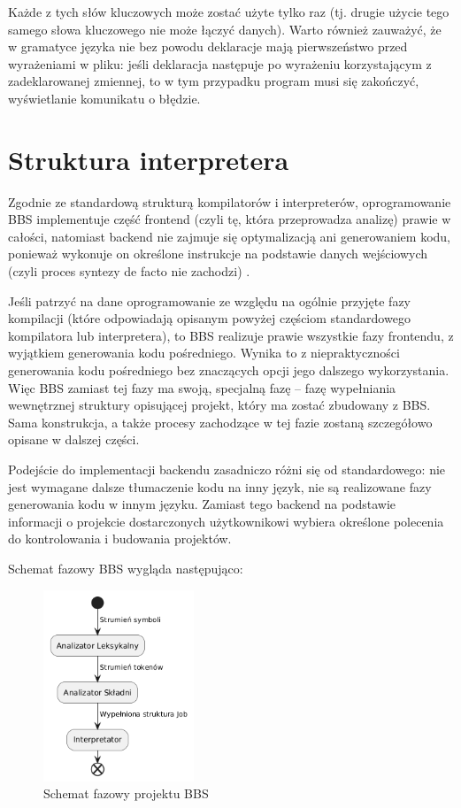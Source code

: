 Każde z tych słów kluczowych może zostać użyte tylko raz (tj. drugie użycie tego samego słowa kluczowego nie może łączyć danych). Warto również zauważyć, że w gramatyce języka nie bez powodu deklaracje mają pierwszeństwo przed wyrażeniami w pliku: jeśli deklaracja następuje po wyrażeniu korzystającym z zadeklarowanej zmiennej, to w tym przypadku program musi się zakończyć, wyświetlanie komunikatu o błędzie.

\section{Struktura interpretera}
Zgodnie ze standardową strukturą kompilatorów i interpreterów, oprogramowanie BBS implementuje część frontend (czyli tę, która przeprowadza analizę) prawie w całości, natomiast backend nie zajmuje się optymalizacją ani generowaniem kodu, ponieważ wykonuje on określone instrukcje na podstawie danych wejściowych (czyli proces syntezy de facto nie zachodzi) \cite{compilers}.

Jeśli patrzyć na dane oprogramowanie ze względu na ogólnie przyjęte fazy kompilacji (które odpowiadają opisanym powyżej częściom standardowego kompilatora lub interpretera), to BBS realizuje prawie wszystkie fazy frontendu, z wyjątkiem generowania kodu pośredniego. Wynika to z niepraktyczności generowania kodu pośredniego bez znaczących opcji jego dalszego wykorzystania. Więc BBS zamiast tej fazy ma swoją, specjalną fazę -- fazę wypełniania wewnętrznej struktury opisującej projekt, który ma zostać zbudowany z BBS. Sama konstrukcja, a także procesy zachodzące w tej fazie zostaną szczegółowo opisane w dalszej części.

Podejście do implementacji backendu zasadniczo różni się od standardowego: nie jest wymagane dalsze tłumaczenie kodu na inny język, nie są realizowane fazy generowania kodu w innym języku. Zamiast tego backend na podstawie informacji o projekcie dostarczonych użytkownikowi wybiera określone polecenia do kontrolowania i budowania projektów.

Schemat fazowy BBS wygląda następująco:

\begin{figure}[h]
    \centering
    \includegraphics[width=0.4\textwidth]{Images/phases.png}
    \caption{Schemat fazowy projektu BBS}
\end{figure}

